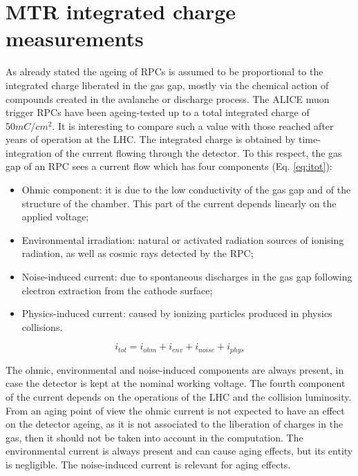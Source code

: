 \section{MTR integrated charge measurements}
\label{currents}
As already stated the ageing of RPCs is assumed to be proportional to the integrated charge liberated in the gas gap, mostly via the chemical action of compounds created in the avalanche or discharge process.
The ALICE muon trigger RPCs  have been ageing-tested up to a total integrated charge of $50 mC/cm^2$. 
It is interesting to compare such a value with those reached after years of operation at the LHC.
The integrated charge is obtained by time-integration of the current flowing through the detector. 
To this respect, the gas gap of an RPC sees a current flow which has four components (Eq. \ref{eq:itot}):
\begin{itemize}
\item Ohmic component: it is due to the low conductivity of the gas gap and of the structure of the chamber. This part of the current depends linearly on the applied voltage;
\item Environmental irradiation: natural or activated radiation sources of ionising radiation, as well as cosmic rays detected by the RPC;
\item Noise-induced current: due to spontaneous discharges in the gas gap following electron extraction from the cathode surface;
\item Physics-induced current: caused by ionizing particles produced in physics collisions.
\end{itemize}

\begin{equation}
\label{eq:itot}
i_{tot}=i_{ohm}+i_{env}+i_{noise}+i_{phys}
\end{equation}

The ohmic, environmental and noise-induced components are always present, in case the detector is kept at the nominal working voltage.
The fourth component of the current depends on the operations of the LHC and the collision luminosity.
From an aging point of view the ohmic current is not expected to have an effect on the detector ageing, as it is not associated to the liberation of charges in the gas, then it should not be taken into account in the computation.
The environmental current is always present and can cause aging effects, but its entity is negligible.
The noise-induced current is relevant for aging effects.


